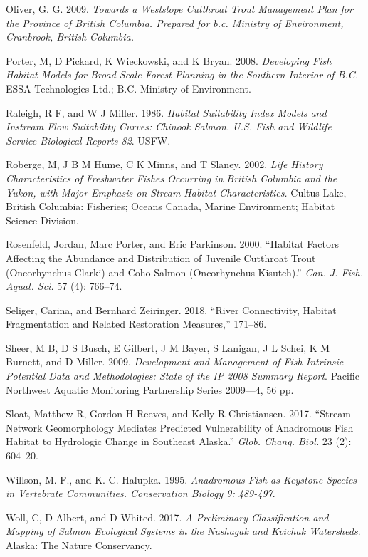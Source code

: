 \documentclass[
  letterpaper,
  DIV=11,
  numbers=noendperiod]{scrreprt}
\newlength{\cslhangindent}
\newenvironment{CSLReferences}[2] %
 {\begin{list}{}{%
  \setlength{\itemindent}{0pt}
  \setlength{\leftmargin}{0pt}
  \setlength{\parsep}{0pt}
  \ifodd #1
   \setlength{\leftmargin}{\cslhangindent}
   \setlength{\itemindent}{-1\cslhangindent}
  \fi
  \setlength{\itemsep}{#2\baselineskip}}}
 {\end{list}}
\begin{document}
\begin{CSLReferences}{1}{0}
Oliver, G. G. 2009. \emph{Towards a Westslope Cutthroat Trout Management
Plan for the Province of British Columbia. Prepared for b.c. Ministry of
Environment, Cranbrook, British Columbia.}

Porter, M, D Pickard, K Wieckowski, and K Bryan. 2008. \emph{Developing
Fish Habitat Models for {Broad-Scale} Forest Planning in the Southern
Interior of {B.C}.} {ESSA} Technologies Ltd.; {B.C}. Ministry of
Environment.

Raleigh, R F, and W J Miller. 1986. \emph{Habitat Suitability Index
Models and Instream Flow Suitability Curves: Chinook Salmon. {U.S}. Fish
and Wildlife Service Biological Reports 82}. USFW.

Roberge, M, J B M Hume, C K Minns, and T Slaney. 2002. \emph{Life
History Characteristics of Freshwater Fishes Occurring in British
Columbia and the Yukon, with Major Emphasis on Stream Habitat
Characteristics.} Cultus Lake, British Columbia: Fisheries; Oceans
Canada, Marine Environment; Habitat Science Division.

Rosenfeld, Jordan, Marc Porter, and Eric Parkinson. 2000. {``Habitat
Factors Affecting the Abundance and Distribution of Juvenile Cutthroat
Trout (Oncorhynchus Clarki) and Coho Salmon (Oncorhynchus Kisutch).''}
\emph{Can. J. Fish. Aquat. Sci.} 57 (4): 766--74.

Seliger, Carina, and Bernhard Zeiringer. 2018. {``River Connectivity,
Habitat Fragmentation and Related Restoration Measures,''} 171--86.

Sheer, M B, D S Busch, E Gilbert, J M Bayer, S Lanigan, J L Schei, K M
Burnett, and D Miller. 2009. \emph{Development and Management of Fish
Intrinsic Potential Data and Methodologies: State of the {IP} 2008
Summary Report}. Pacific Northwest Aquatic Monitoring Partnership Series
2009---4, 56 pp.

Sloat, Matthew R, Gordon H Reeves, and Kelly R Christiansen. 2017.
{``Stream Network Geomorphology Mediates Predicted Vulnerability of
Anadromous Fish Habitat to Hydrologic Change in Southeast Alaska.''}
\emph{Glob. Chang. Biol.} 23 (2): 604--20.

Willson, M. F., and K. C. Halupka. 1995. \emph{Anadromous Fish as
Keystone Species in Vertebrate Communities. Conservation Biology 9:
489-497}.

Woll, C, D Albert, and D Whited. 2017. \emph{A Preliminary
Classification and Mapping of Salmon Ecological Systems in the Nushagak
and Kvichak Watersheds}. Alaska: The Nature Conservancy.

\end{CSLReferences}
\end{document}
